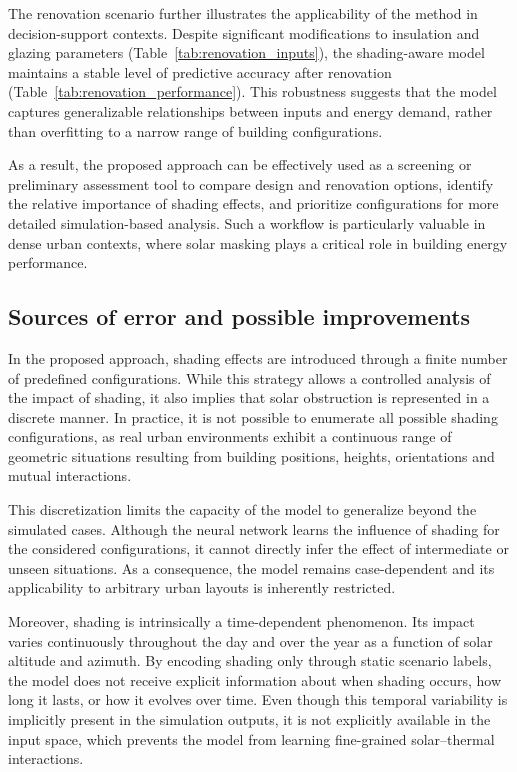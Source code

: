 \documentclass{article}
\begin{document}
The renovation scenario further illustrates the applicability of the method in
decision-support contexts. Despite significant modifications to insulation and
glazing parameters (Table~\ref{tab:renovation_inputs}), the shading-aware model
maintains a stable level of predictive accuracy after renovation
(Table~\ref{tab:renovation_performance}). This robustness suggests that the model
captures generalizable relationships between inputs and energy demand, rather
than overfitting to a narrow range of building configurations.

As a result, the proposed approach can be effectively used as a screening or
preliminary assessment tool to compare design and renovation options, identify
the relative importance of shading effects, and prioritize configurations for
more detailed simulation-based analysis. Such a workflow is particularly
valuable in dense urban contexts, where solar masking plays a critical role in
building energy performance.
\subsection{Sources of error and possible improvements}

In the proposed approach, shading effects are introduced through a finite number
of predefined configurations. While this strategy allows a controlled analysis
of the impact of shading, it also implies that solar obstruction is represented
in a discrete manner. In practice, it is not possible to enumerate all possible
shading configurations, as real urban environments exhibit a continuous range of
geometric situations resulting from building positions, heights, orientations
and mutual interactions.

This discretization limits the capacity of the model to generalize beyond the
simulated cases. Although the neural network learns the influence of shading for
the considered configurations, it cannot directly infer the effect of
intermediate or unseen situations. As a consequence, the model remains
case-dependent and its applicability to arbitrary urban layouts is inherently
restricted.

Moreover, shading is intrinsically a time-dependent phenomenon. Its impact
varies continuously throughout the day and over the year as a function of solar
altitude and azimuth. By encoding shading only through static scenario labels,
the model does not receive explicit information about when shading occurs, how
long it lasts, or how it evolves over time. Even though this temporal variability
is implicitly present in the simulation outputs, it is not explicitly available
in the input space, which prevents the model from learning fine-grained
solar–thermal interactions.
\end{document}
